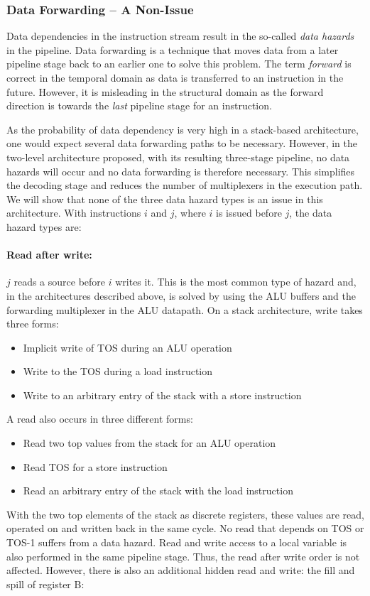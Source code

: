 \subsubsection{Data Forwarding -- A Non-Issue}

Data dependencies in the instruction stream result in the so-called
\emph{data hazards} \cite{Hennessy06} in the pipeline. Data
forwarding is a technique that moves data from a later pipeline stage
back to an earlier one to solve this problem. The term \emph{forward}
is correct in the temporal domain as data is transferred to an
instruction in the future. However, it is misleading in the
structural domain as the forward direction is towards the \emph{last}
pipeline stage for an instruction.

As the probability of data dependency is very high in a stack-based
architecture, one would expect several data forwarding paths to be
necessary. However, in the two-level architecture proposed, with its
resulting three-stage pipeline, no data hazards will occur and no
data forwarding is therefore necessary. This simplifies the decoding
stage and reduces the number of multiplexers in the execution path.
We will show that none of the three data hazard types
\cite{Hennessy06} is an issue in this architecture. With instructions
$i$ and $j$, where $i$ is issued before $j$, the data hazard types
are:

\paragraph{Read after write:} $j$ reads a source before $i$ writes it. This
is the most common type of hazard and, in the architectures
described above, is solved by using the ALU buffers and the
forwarding multiplexer in the ALU datapath. On a stack architecture,
write takes three forms:
%
\begin{itemize}
    \item Implicit write of TOS during an ALU operation
    \item Write to the TOS during a load instruction
    \item Write to an arbitrary entry of the stack with a store instruction
\end{itemize}
%
A read also occurs in three different forms:
\begin{itemize}
    \item Read two top values from the stack for an ALU operation
    \item Read TOS for a store instruction
    \item Read an arbitrary entry of the stack with the load instruction
\end{itemize}
%
With the two top elements of the stack as discrete registers, these
values are read, operated on and written back in the same cycle. No
read that depends on TOS or TOS-1 suffers from a data hazard. Read
and write access to a local variable is also performed in the same
pipeline stage. Thus, the read after write order is not affected.
However, there is also an additional hidden read and write: the fill
and spill of register B:



